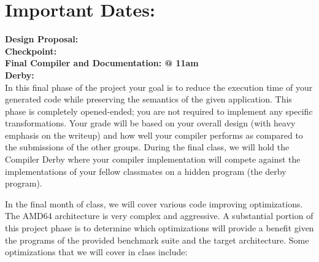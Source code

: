 


\section*{Important Dates:}
{\bf Design Proposal: \OPTIMIZERDESIGNDUE}\\
{\bf Checkpoint: \OPTIMIZERCKPTDUE}\\
{\bf Final Compiler and Documentation: \OPTIMIZERDUE @ 11am}\\
{\bf Derby: \DERBY}\\

In this final phase of the project your goal is to reduce the
execution time of your generated code while preserving the semantics
of the given application.  This phase is completely opened-ended; you
are not required to implement any specific transformations.  Your
grade will be based on your overall design (with heavy emphasis on
the writeup) and how well your compiler performs as compared to the
submissions of the other groups.  During the final class, we will hold
the Compiler Derby where your compiler implementation will compete
against the implementations of your fellow classmates on a hidden
program (the derby program).

In the final month of class, we will cover various code improving
optimizations.  The AMD64 architecture is very complex and aggressive.
A substantial portion of this project phase is to determine which
optimizations will provide a benefit given the programs of the provided
benchmark suite and the target architecture. Some optimizations that
we will cover in class include:

